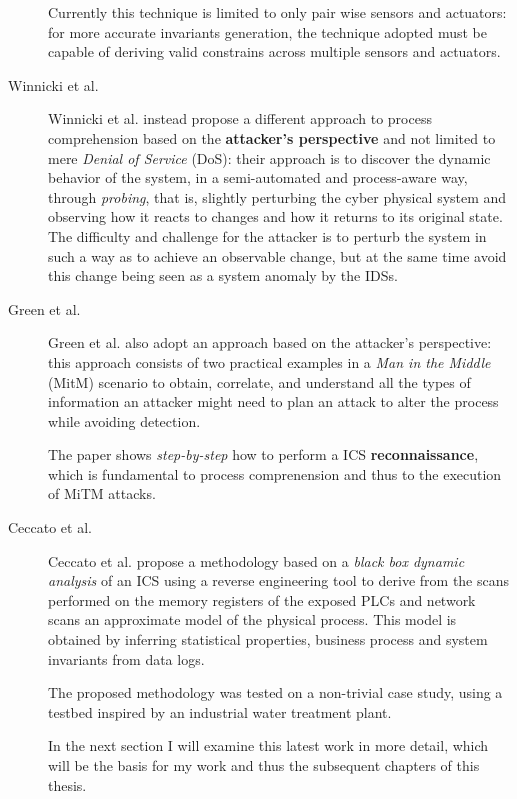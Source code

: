 \begin{description}
	Currently this technique is limited to only pair wise sensors and actuators: for more accurate invariants generation, the technique adopted must be capable of deriving valid constrains across multiple sensors and actuators.
	
	\item[Winnicki et al.] Winnicki et al. \cite{winnicki_et_al} instead propose a different approach to process comprehension based on the \textbf{attacker's perspective} and not limited to mere \textit{Denial of Service} (DoS): their approach is to discover the dynamic behavior of the system, in a semi-automated and process-aware way, through \textit{probing}, that is, slightly perturbing the cyber physical system and observing how it reacts to changes and how it returns to its original state. The difficulty and challenge for the attacker is to perturb the system in such a way as to achieve an observable change, but at the same time avoid this change being seen as a system anomaly by the IDSs.
	
	\item[Green et al.] Green et al. \cite{green_et_al} also adopt an approach based on the attacker's perspective: this approach consists of two practical examples in a \textit{Man in the Middle} (MitM) scenario to obtain, correlate, and understand all the types of information an attacker might need to plan an attack to alter the process while avoiding detection.
	
	The paper shows \textit{step-by-step} how to perform a ICS \textbf{reconnaissance}, which is fundamental to process comprenension and thus to the execution of MiTM attacks.
	
	\item[Ceccato et al.] Ceccato et al. \cite{ceccato} propose a methodology based on a \textit{black box dynamic analysis} of an ICS using a reverse engineering tool to derive from the scans performed on the memory registers of the exposed PLCs and network scans an approximate model of the physical process. This model is obtained by inferring statistical properties, business process and system invariants from data logs.
	
	The proposed methodology was tested on a non-trivial case study, using a testbed inspired by an industrial water treatment plant.
	
	In the next section I will examine this latest work in more detail, which will be the basis for my work and thus the subsequent chapters of this thesis.

\end{description}

